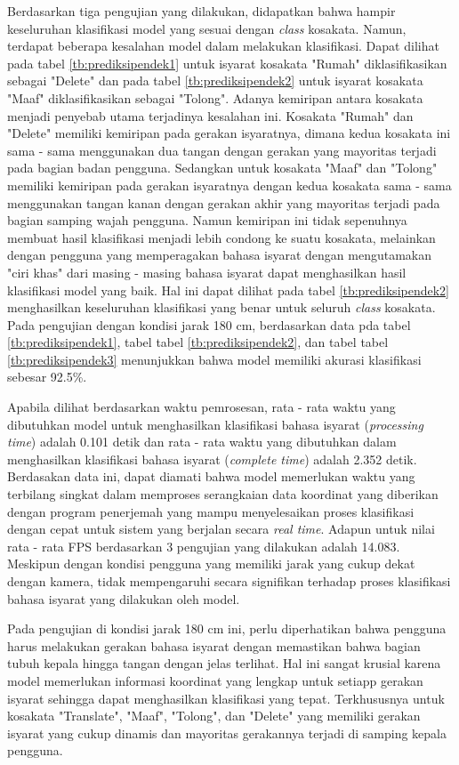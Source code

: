 Berdasarkan tiga pengujian yang dilakukan, didapatkan bahwa hampir keseluruhan klasifikasi model yang sesuai dengan \emph{class} kosakata. Namun, terdapat beberapa kesalahan model dalam melakukan klasifikasi. Dapat dilihat pada tabel \ref{tb:prediksipendek1} untuk isyarat kosakata "Rumah" diklasifikasikan sebagai "Delete" dan pada tabel \ref{tb:prediksipendek2} untuk isyarat kosakata "Maaf" diklasifikasikan sebagai "Tolong". Adanya kemiripan antara kosakata menjadi penyebab utama terjadinya kesalahan ini. Kosakata "Rumah" dan "Delete" memiliki kemiripan pada gerakan isyaratnya, dimana kedua kosakata ini sama - sama menggunakan dua tangan dengan gerakan yang mayoritas terjadi pada bagian badan pengguna. Sedangkan untuk kosakata "Maaf" dan "Tolong" memiliki kemiripan pada gerakan isyaratnya dengan kedua kosakata sama - sama menggunakan tangan kanan dengan gerakan akhir yang mayoritas terjadi pada bagian samping wajah pengguna. Namun kemiripan ini tidak sepenuhnya membuat hasil klasifikasi menjadi lebih condong ke suatu kosakata, melainkan dengan pengguna yang memperagakan bahasa isyarat dengan mengutamakan "ciri khas" dari masing - masing bahasa isyarat dapat menghasilkan hasil klasifikasi model yang baik. Hal ini dapat dilihat pada tabel \ref{tb:prediksipendek2} menghasilkan keseluruhan klasifikasi yang benar untuk seluruh \emph{class} kosakata. Pada pengujian dengan kondisi jarak 180 cm, berdasarkan data pda tabel \ref{tb:prediksipendek1}, tabel tabel \ref{tb:prediksipendek2}, dan tabel tabel \ref{tb:prediksipendek3} menunjukkan bahwa model memiliki akurasi klasifikasi sebesar 92.5\%.

Apabila dilihat berdasarkan waktu pemrosesan, rata - rata waktu yang dibutuhkan model untuk menghasilkan klasifikasi bahasa isyarat (\emph{processing time}) adalah 0.101 detik dan rata - rata waktu yang dibutuhkan dalam menghasilkan klasifikasi bahasa isyarat (\emph{complete time}) adalah 2.352 detik. Berdasakan data ini, dapat diamati bahwa model memerlukan waktu yang terbilang singkat dalam memproses serangkaian data koordinat yang diberikan dengan program penerjemah yang mampu menyelesaikan proses klasifikasi dengan cepat untuk sistem yang berjalan secara \emph{real time}. Adapun untuk nilai rata - rata FPS berdasarkan 3 pengujian yang dilakukan adalah 14.083. Meskipun dengan kondisi pengguna yang memiliki jarak yang cukup dekat dengan kamera, tidak mempengaruhi secara signifikan terhadap proses klasifikasi bahasa isyarat yang dilakukan oleh model.

Pada pengujian di kondisi jarak 180 cm ini, perlu diperhatikan bahwa pengguna harus melakukan gerakan bahasa isyarat dengan memastikan bahwa bagian tubuh kepala hingga tangan dengan jelas terlihat. Hal ini sangat krusial karena model memerlukan informasi koordinat yang lengkap untuk setiapp gerakan isyarat sehingga dapat menghasilkan klasifikasi yang tepat. Terkhususnya untuk kosakata "Translate", "Maaf", "Tolong", dan "Delete" yang memiliki gerakan isyarat yang cukup dinamis dan mayoritas gerakannya terjadi di samping kepala pengguna.  

